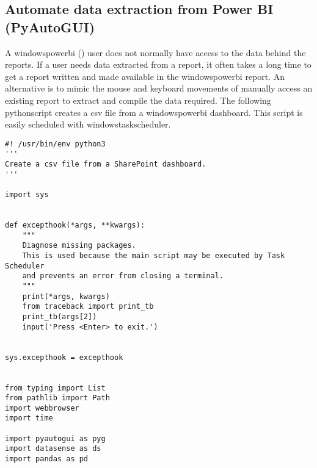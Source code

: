 \documentclass[10pt, letterpaper, twoside]{article}
\begin{document}
\subsection{Automate data extraction from Power BI (PyAutoGUI)}\label{sec:automate_data_extraction_from_power_bi}
A \Gls{windowspowerbi} (\cite{windowspowerbi}) user does not normally have access to the data behind the reports. If a user needs data extracted from a report, it often takes a long time to get a report written and made available in the \Gls{windowspowerbi} report. An alternative is to mimic the mouse and keyboard movements of manually access an existing report to extract and compile the data required. The following \Gls{pythonscript} creates a csv file from a \Gls{windowspowerbi} dashboard. This script is easily scheduled with \Gls{windowstaskscheduler}.
\begin{footnotesize}
\begin{verbatim}
#! /usr/bin/env python3
'''
Create a csv file from a SharePoint dashboard.
'''

import sys


def excepthook(*args, **kwargs):
    """
    Diagnose missing packages.
    This is used because the main script may be executed by Task Scheduler
    and prevents an error from closing a terminal.
    """
    print(*args, kwargs)
    from traceback import print_tb
    print_tb(args[2])
    input('Press <Enter> to exit.')


sys.excepthook = excepthook


from typing import List
from pathlib import Path
import webbrowser
import time

import pyautogui as pyg
import datasense as ds
import pandas as pd



\end{verbatim}
\end{footnotesize}
\end{document}
